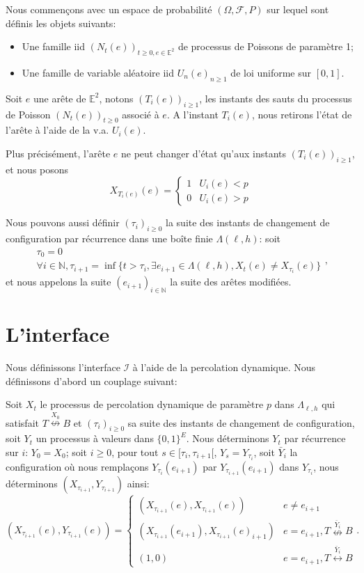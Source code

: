 \documentclass[titlepage,a4paper,12pt]{article}
\begin{document}
Nous commençons avec un espace de probabilité $(\Omega, \mathcal{F},P)$ sur lequel sont définis les objets suivants:

\begin{itemize}[label = $\bullet$, leftmargin = *]
\item Une famille iid $(N_t(e))_{t\geqslant 0, e \in \mathbb{E}^2}$ de processus de Poissons de paramètre 1;
\item Une famille de variable aléatoire iid $U_n(e)_{n\geqslant 1}$ de loi uniforme sur $[0,1]$.
\end{itemize} 


Soit $e$ une arête de $\mathbb{E}^2$, notons $(T_i(e))_{i\geqslant 1}$, les instants des sauts du processus de Poisson $(N_t(e))_{t\geqslant 0}$ associé à $e$. A l'instant $T_i(e)$, nous retirons l'état de l'arête à l'aide de la v.a. $U_i(e)$.

Plus précisément, l'arête $e$ ne peut changer d'état qu'aux instants $(T_i(e))_{i\geqslant 1}$, et nous posons 
$$ X_{T_i(e)}(e) = \left\lbrace \begin{array}{cc}
1 & U_i(e) < p \\
0 & U_i(e) > p
\end{array}
\right.
$$

Nous pouvons aussi définir $(\tau_i)_{i\geqslant 0}$ la suite des instants de changement de configuration par récurrence dans une boîte finie $\Lambda(\ell,h)$: soit $$\left.
\begin{array}{l}
\tau_0 = 0 \\
\forall i\in \mathbb{N},\tau_{i+1} = \inf \{ t>\tau_i, \exists e_{i+1} \in \Lambda(\ell,h), X_t(e) \neq X_{\tau_i}(e)\}
\end{array}\right.,$$
et nous appelons la suite $(e_{i+1})_{i\in\mathbb{N}}$ la suite des arêtes modifiées.
\section{L'interface}
Nous définissons l'interface $\mathcal{I}$ à l'aide de la percolation dynamique. Nous définissons d'abord un couplage suivant:

Soit $X_t$ le processus de percolation dynamique de paramètre $p$ dans $\Lambda_{\ell,h}$ qui satisfait $T\overset{X_0}{\nleftrightarrow}B$ et $(\tau_i)_{i\geqslant 0}$ sa suite des instants de changement de configuration, soit $Y_t$ un processus à valeurs dans $\{0,1\}^E$. Nous déterminons $Y_t$ par récurrence sur $i$: $Y_0=X_0$; soit $i\geqslant 0$, pour tout $s\in [\tau_i, \tau_{i+1}[$, $Y_s = Y_{\tau_i}$, soit $\bar{Y}_i$ la configuration où nous remplaçons $Y_{\tau_i}(e_{i+1})$ par $Y_{\tau_{i+1}}(e_{i+1})$ dans $Y_{\tau_i}$, nous déterminons $(X_{\tau_{i+1}},Y_{\tau_{i+1}})$ ainsi:
$$(X_{\tau_{i+1}}(e),Y_{\tau_{i+1}}(e))=\left\lbrace \begin{array}{cc}
(X_{\tau_{i+1}}(e),X_{\tau_{i+1}}(e)) & e \neq e_{i+1}\\
(X_{\tau_{i+1}}(e_{i+1}),X_{\tau_{i+1}}(e)_{i+1}) & e = e_{i+1}, T \overset{\bar{Y}_i}{\nleftrightarrow} B \\
(1,0) & e = e_{i+1},T\overset{\bar{Y}_i}{\leftrightarrow} B 
\end{array}\right..$$
\end{document}
